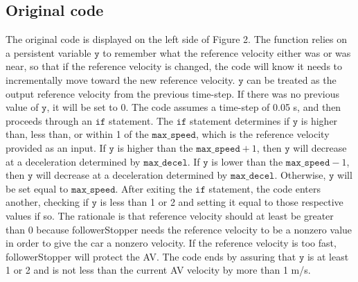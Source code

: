 \documentclass[12pt, letterpaper]{article}
\begin{document}
\subsection{Original code}
The original code is displayed on the left side of Figure 2. The function relies on a persistent variable $\mathtt{y}$ to remember what the reference velocity either was or was near, so that if the reference velocity is changed, the code will know it needs to incrementally move toward the new reference velocity. $\mathtt{y}$ can be treated as the output reference velocity from the previous time-step. If there was no previous value of $\mathtt{y}$, it will be set to 0. The code assumes a time-step of 0.05 s, and then proceeds through an $\mathtt{if}$ statement. The $\mathtt{if}$ statement determines if $\mathtt{y}$ is higher than, less than, or within 1 of the $\mathtt{max\_speed}$, which is the reference velocity provided as an input. If $\mathtt{y}$ is higher than the $\mathtt{max\_speed}+1$, then $\mathtt{y}$ will decrease at a deceleration determined by $\mathtt{max\_decel}$. If $\mathtt{y}$ is lower than the $\mathtt{max\_speed}-1$, then $\mathtt{y}$ will decrease at a deceleration determined by $\mathtt{max\_decel}$. Otherwise, $\mathtt{y}$ will be set equal to $\mathtt{max\_speed}$. After exiting the $\mathtt{if}$ statement, the code enters another, checking if $\mathtt{y}$ is less than 1 or 2 and setting it equal to those respective values if so. The rationale is that reference velocity should at least be greater than 0 because followerStopper needs the reference velocity to be a nonzero value in order to give the car a nonzero velocity. If the reference velocity is too fast, followerStopper will protect the AV. The code ends by assuring that $\mathtt{y}$ is at least 1 or 2 and is not less than the current AV velocity by more than 1 m/s.
\end{document}
